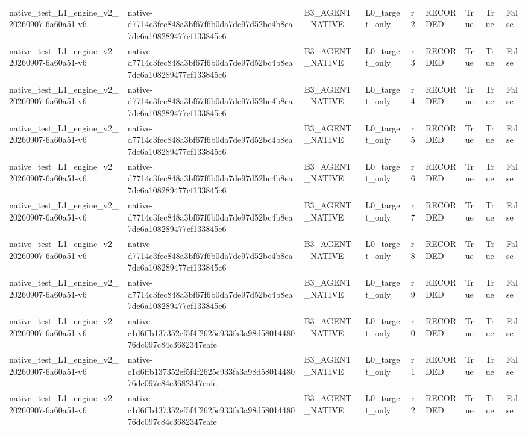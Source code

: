 \begin{tabular}{lllllllll}
native\_test\_L1\_engine\_v2\_20260907-6a60a51-v6 & native-d7714c3fec848a3bf67f6b0da7de97d52bc4b8ea7dc6a108289477cf133845c6 & B3\_AGENT\_NATIVE & L0\_target\_only & r2 & RECORDED & True & True & False \\
native\_test\_L1\_engine\_v2\_20260907-6a60a51-v6 & native-d7714c3fec848a3bf67f6b0da7de97d52bc4b8ea7dc6a108289477cf133845c6 & B3\_AGENT\_NATIVE & L0\_target\_only & r3 & RECORDED & True & True & False \\
native\_test\_L1\_engine\_v2\_20260907-6a60a51-v6 & native-d7714c3fec848a3bf67f6b0da7de97d52bc4b8ea7dc6a108289477cf133845c6 & B3\_AGENT\_NATIVE & L0\_target\_only & r4 & RECORDED & True & True & False \\
native\_test\_L1\_engine\_v2\_20260907-6a60a51-v6 & native-d7714c3fec848a3bf67f6b0da7de97d52bc4b8ea7dc6a108289477cf133845c6 & B3\_AGENT\_NATIVE & L0\_target\_only & r5 & RECORDED & True & True & False \\
native\_test\_L1\_engine\_v2\_20260907-6a60a51-v6 & native-d7714c3fec848a3bf67f6b0da7de97d52bc4b8ea7dc6a108289477cf133845c6 & B3\_AGENT\_NATIVE & L0\_target\_only & r6 & RECORDED & True & True & False \\
native\_test\_L1\_engine\_v2\_20260907-6a60a51-v6 & native-d7714c3fec848a3bf67f6b0da7de97d52bc4b8ea7dc6a108289477cf133845c6 & B3\_AGENT\_NATIVE & L0\_target\_only & r7 & RECORDED & True & True & False \\
native\_test\_L1\_engine\_v2\_20260907-6a60a51-v6 & native-d7714c3fec848a3bf67f6b0da7de97d52bc4b8ea7dc6a108289477cf133845c6 & B3\_AGENT\_NATIVE & L0\_target\_only & r8 & RECORDED & True & True & False \\
native\_test\_L1\_engine\_v2\_20260907-6a60a51-v6 & native-d7714c3fec848a3bf67f6b0da7de97d52bc4b8ea7dc6a108289477cf133845c6 & B3\_AGENT\_NATIVE & L0\_target\_only & r9 & RECORDED & True & True & False \\
native\_test\_L1\_engine\_v2\_20260907-6a60a51-v6 & native-c1d6ffb137352ef5f4f2625c933fa3a98d5801448076dc097c84c3682347eafe & B3\_AGENT\_NATIVE & L0\_target\_only & r0 & RECORDED & True & True & False \\
native\_test\_L1\_engine\_v2\_20260907-6a60a51-v6 & native-c1d6ffb137352ef5f4f2625c933fa3a98d5801448076dc097c84c3682347eafe & B3\_AGENT\_NATIVE & L0\_target\_only & r1 & RECORDED & True & True & False \\
native\_test\_L1\_engine\_v2\_20260907-6a60a51-v6 & native-c1d6ffb137352ef5f4f2625c933fa3a98d5801448076dc097c84c3682347eafe & B3\_AGENT\_NATIVE & L0\_target\_only & r2 & RECORDED & True & True & False \\

\end{tabular}
